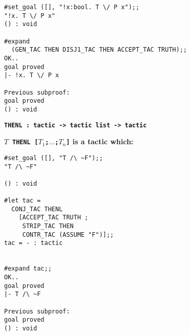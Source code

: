 \vskip4mm
\begin{session}\begin{verbatim}
#set_goal ([], "!x:bool. T \/ P x");;
"!x. T \/ P x"
() : void

#expand
  (GEN_TAC THEN DISJ1_TAC THEN ACCEPT_TAC TRUTH);;
OK..
goal proved
|- !x. T \/ P x

Previous subproof:
goal proved
() : void
\end{verbatim}\end{session}




\vskip5mm

\vskip6mm
\bspindent\LARGE\bf
\verb!THENL : tactic -> tactic list -> tactic!
\espindent

\vskip7mm
\vskip5mm
\bspindent\LARGE\bf
{\tt $T\;\;$\verb!THENL!$\;\;$[$T_1$;$\dots$;$T_n$]}
\espindent
\vskip5mm
\bpindent\LARGE\bf
is a tactic which:
\epindent
\vskip 5mm




\vskip4mm
\begin{session}\begin{verbatim}
#set_goal ([], "T /\ ~F");;
"T /\ ~F"

() : void

#let tac = 
  CONJ_TAC THENL
    [ACCEPT_TAC TRUTH ;
     STRIP_TAC THEN 
     CONTR_TAC (ASSUME "F")];;
tac = - : tactic


#expand tac;;
OK..
goal proved
|- T /\ ~F

Previous subproof:
goal proved
() : void
\end{verbatim}\end{session}



